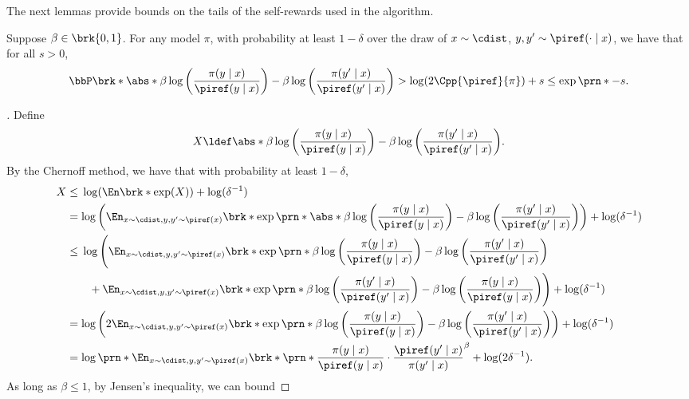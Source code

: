 The next lemmas provide bounds on the tails of the self-rewards used
in the algorithm.

\begin{lemma}
  \label{lem:logprob_bound}
  Suppose $\beta\in\brk{0,1}$. For any model $\pi$, with probability at least
  $1-\delta$ over the draw of $x\sim\cdist$, $y,y'\sim\piref(\cdot\mid x)$, we
  have that
  for all $s>0$, 
  \begin{align}
    \bbP\brk*{
    \abs*{\beta\log\left(\frac{\pi(y\mid{}x)}{\piref(y\mid{}x)}\right)-\beta\log\left(\frac{\pi(y'\mid{}x)}{\piref(y'\mid{}x)}\right)}
    > \log(2\Cpp{\piref}{\pi}) + s} \leq \exp\prn*{-s}.
  \end{align}
\end{lemma}
\begin{proof}[]
Define 
\[X\ldef\abs*{\beta\log\left(\frac{\pi(y\mid{}x)}{\piref(y\mid{}x)}\right)-\beta\log\left(\frac{\pi(y'\mid{}x)}{\piref(y'\mid{}x)}\right)}.\] 
By the
Chernoff method, we have that with probability at least $1-\delta$,
\begin{align}
  X
  &\leq{} \log(\En\brk*{\exp(X)}) + \log(\delta^{-1})\\
  &= \log\left(\En_{x\sim\cdist,y,y'\sim\piref(x)}\brk*{\exp\prn*{\abs*{\beta\log\left(\frac{\pi(y\mid{}x)}{\piref(y\mid{}x)}\right)-\beta\log\left(\frac{\pi(y'\mid{}x)}{\piref(y'\mid{}x)}\right)}}}\right)
    + \log(\delta^{-1})\\
    &\leq{}     \log\Bigg(\En_{x\sim\cdist,y,y'\sim\piref(x)}\brk*{\exp\prn*{\beta\log\left(\frac{\pi(y\mid{}x)}{\piref(y\mid{}x)}\right)-\beta\log\left(\frac{\pi(y'\mid{}x)}{\piref(y'\mid{}x)}\right)}}
      \\&\qquad+
      \En_{x\sim\cdist,y,y'\sim\piref(x)}\brk*{\exp\prn*{\beta\log\left(\frac{\pi(y'\mid{}x)}{\piref(y'\mid{}x)}\right)-\beta\log\left(\frac{\pi(y\mid{}x)}{\piref(y\mid{}x)}\right)}}\Bigg)
      + \log(\delta^{-1})\\
      &=
      \log\left(2\En_{x\sim\cdist,y,y'\sim\piref(x)}\brk*{\exp\prn*{\beta\log\left(\frac{\pi(y\mid{}x)}{\piref(y\mid{}x)}\right)-\beta\log\left(\frac{\pi(y'\mid{}x)}{\piref(y'\mid{}x)}\right)}}\right)
        + \log(\delta^{-1})\\
        &=
          \log\prn*{\En_{x\sim\cdist,y,y'\sim\piref(x)}\brk*{\prn*{\frac{\pi(y\mid{}x)}{\piref(y\mid{}x)}\cdot\frac{\piref(y'\mid{}x)}{\pi(y'\mid{}x)}}^\beta
          }}
        + \log(2\delta^{-1}).
\end{align}
As long as $\beta\leq{}1$, by Jensen's inequality, we can bound

\end{proof}
